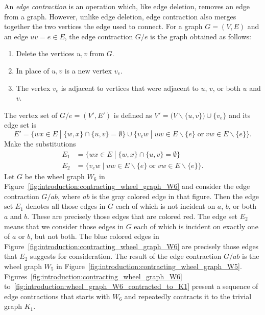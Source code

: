 An \emph{edge contraction} is an operation
which, like edge deletion, removes an edge from a graph. However,
unlike edge deletion, edge contraction also merges together the two
vertices the edge used to connect. For a graph $G = (V, E)$ and an
edge $uv = e \in E$, the edge contraction $G/e$ is the graph obtained
as follows:
\begin{enumerate}
\item Delete the vertices $u,v$ from $G$.

\item In place of $u,v$ is a new vertex $v_e$.

\item The vertex $v_e$ is adjacent to vertices that were adjacent
  to $u$, $v$, or both $u$ and $v$.
\end{enumerate}
The vertex set of $G/e = (V', E')$ is defined as
$V' = \big(V \backslash \{u,v\}\big) \cup \{v_e\}$ and its edge set is
\[
E'
=
\big\{
wx \in E \;\left.\right|\; \{w,x\} \cap \{u,v\} = \emptyset
\big\}
\cup
\big\{
v_e w
\;\left.\right|\;
uw \in E \backslash \{e\} \;\text{or}\; vw \in E \backslash \{e\}
\big\}.
\]
Make the substitutions
\begin{align*}
E_1 &= \big\{
wx \in E \;\left.\right|\; \{w,x\} \cap \{u,v\} = \emptyset \big\} \\
E_2 &= \big\{
v_e w \;\left.\right|\;
uw \in E \backslash \{e\} \;\text{or}\; vw \in E \backslash \{e\} \big\}.
\end{align*}
Let $G$ be the wheel graph $W_6$ in
Figure~\ref{fig:introduction:contracting_wheel_graph_W6} and consider
the edge contraction $G/ab$, where $ab$ is the gray colored edge in
that figure. Then the edge set $E_1$ denotes all those edges in $G$
each of which is not incident on $a$, $b$, or both $a$ and $b$. These
are precisely those edges that are colored red. The edge set $E_2$
means that we consider those edges in $G$ each of which is incident on
exactly one of $a$ or $b$, but not both. The blue colored edges in
Figure~\ref{fig:introduction:contracting_wheel_graph_W6} are precisely
those edges that $E_2$ suggests for consideration. The result of the
edge contraction $G/ab$ is the wheel graph $W_5$ in
Figure~\ref{fig:introduction:contracting_wheel_graph_W5}.
Figures~\ref{fig:introduction:contracting_wheel_graph_W6}
to~\ref{fig:introduction:wheel_graph_W6_contracted_to_K1} present a
sequence of edge contractions that starts with $W_6$ and repeatedly
contracts it to the trivial graph $K_1$.

